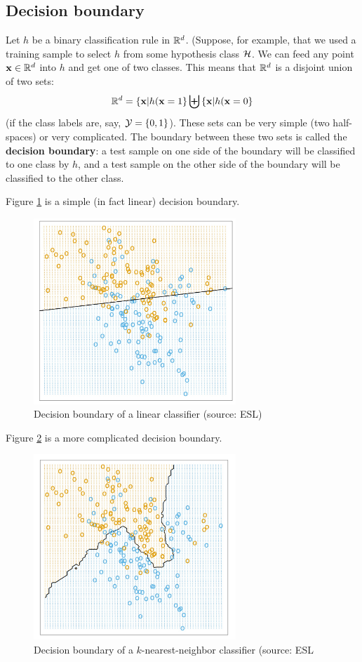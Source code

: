     \subsection{Decision boundary}
    
    Let $h$ be a binary classification rule in $\mathbb{R}^d$. (Suppose, for example, that
      we used a training sample to select $h$ from some hypothesis class $\mathcal{H}$. 
      We can feed any point $\mathbf{x}\in\mathbb{R}^d$ into $h$ and get one of two
      classes. This means that $\mathbb{R}^d$ is a disjoint union of two sets:
      \[
	\mathbb{R}^d = \left\{ \mathbf{x}|h(\mathbf{x}=1 \right\} \biguplus \left\{
	    \mathbf{x}|h(\mathbf{x}=0 \right\}  
      \]
      (if the class labels are, say, $\mathcal{Y}= \left\{ 0,1 \right\}$).
      These sets can be very simple (two half-spaces) or very complicated.
      The boundary between these two sets is called the {\bf decision boundary}: 
      a test sample on one side of the boundary will be classified to one class
      by $h$, and a test sample on the other side of the boundary will be
      classified to the other class. 


      Figure \ref{b1} is a simple (in fact linear) decision boundary.
      \begin{figure}[h!]
      \centering
      \includegraphics[width=3in]{b1.pdf}
      \caption{Decision boundary of a linear classifier (source: ESL)}
      \label{b1}
    \end{figure}

    Figure \ref{b2} is a more complicated decision boundary.

    \begin{figure}[h!]
      \centering
      \includegraphics[width=3in]{b2.pdf}
      \caption{Decision boundary of a $k$-nearest-neighbor classifier (source:
	ESL}
	\label{b2}
    \end{figure}


